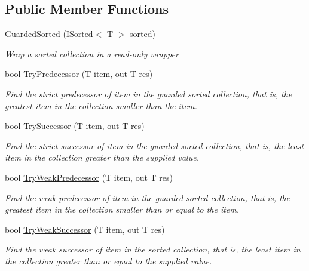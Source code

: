\subsection*{Public Member Functions}
\begin{DoxyCompactItemize}
\item 
\hyperlink{class_c5_1_1_guarded_sorted_a83a43467e2f40a5d7994c165df409c9d}{Guarded\+Sorted} (\hyperlink{interface_c5_1_1_i_sorted}{I\+Sorted}$<$ T $>$ sorted)
\begin{DoxyCompactList}\small\item\em Wrap a sorted collection in a read-\/only wrapper \end{DoxyCompactList}\item 
bool \hyperlink{class_c5_1_1_guarded_sorted_a5d51f1d79c4ad4c84684f6102562d44a}{Try\+Predecessor} (T item, out T res)
\begin{DoxyCompactList}\small\item\em Find the strict predecessor of item in the guarded sorted collection, that is, the greatest item in the collection smaller than the item. \end{DoxyCompactList}\item 
bool \hyperlink{class_c5_1_1_guarded_sorted_a7a8a2a146dc48c07818e434f14473dac}{Try\+Successor} (T item, out T res)
\begin{DoxyCompactList}\small\item\em Find the strict successor of item in the guarded sorted collection, that is, the least item in the collection greater than the supplied value. \end{DoxyCompactList}\item 
bool \hyperlink{class_c5_1_1_guarded_sorted_ac0895c0ec8adf94a479c0a22b337b122}{Try\+Weak\+Predecessor} (T item, out T res)
\begin{DoxyCompactList}\small\item\em Find the weak predecessor of item in the guarded sorted collection, that is, the greatest item in the collection smaller than or equal to the item. \end{DoxyCompactList}\item 
bool \hyperlink{class_c5_1_1_guarded_sorted_a0f00bb7238c3bc374aa085205448f533}{Try\+Weak\+Successor} (T item, out T res)
\begin{DoxyCompactList}\small\item\em Find the weak successor of item in the sorted collection, that is, the least item in the collection greater than or equal to the supplied value. \end{DoxyCompactList}\item 

\end{DoxyCompactItemize}
